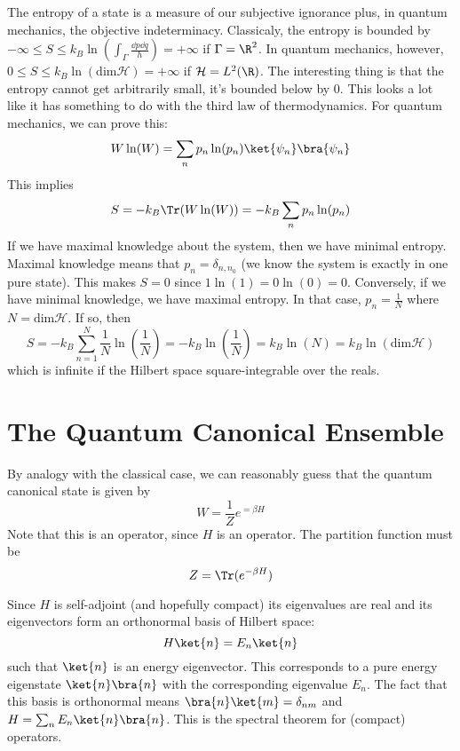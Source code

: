 \documentclass[a4paper,twoside,master.tex]{subfiles}
\begin{document}
The entropy of a state is a measure of our subjective ignorance plus, in quantum mechanics, the objective indeterminacy. Classicaly, the entropy is bounded by $ - \infty \leq S \leq k_B \ln(\int_{\Gamma} \frac{\dd{p} \dd{q}}{h}) = + \infty $ if $ \Gamma = \R^2 $. In quantum mechanics, however, $ 0 \leq S \leq k_B \ln(\text{dim} \mathcal{H}) = + \infty $ if $ \mathcal{H} = L^2(\R) $. The interesting thing is that the entropy cannot get arbitrarily small, it's bounded below by $ 0 $. This looks a lot like it has something to do with the third law of thermodynamics. For quantum mechanics, we can prove this:
\begin{equation}
    W \ln(W) = \sum_n p_n \ln(p_n)\ket{\psi_n}\bra{\psi_n}
\end{equation}
This implies
\begin{equation}
    S = - k_B \Tr(W \ln(W)) = - k_B \sum_n p_n \ln(p_n)
\end{equation}
If we have maximal knowledge about the system, then we have minimal entropy. Maximal knowledge means that $ p_n = \delta_{n,n_0} $ (we know the system is exactly in one pure state). This makes $ S = 0 $ since $ 1 \ln(1) = 0 \ln(0) = 0 $. Conversely, if we have minimal knowledge, we have maximal entropy. In that case, $ p_n = \frac{1}{N} $ where $ N = \text{dim} \mathcal{H} $. If so, then
\begin{equation}
    S = - k_B \sum_{n=1}^{N} \frac{1}{N} \ln(\frac{1}{N}) = - k_B \ln(\frac{1}{N}) = k_B \ln(N) = k_B \ln(\text{dim} \mathcal{H})
\end{equation}
which is infinite if the Hilbert space square-integrable over the reals.


\section{The Quantum Canonical Ensemble}
\label{sec:the_quantum_canonical_ensemble}

By analogy with the classical case, we can reasonably guess that the quantum canonical state is given by
\begin{equation}
    W = \frac{1}{Z} e^{= \beta H}
\end{equation}
Note that this is an operator, since $ H $ is an operator. The partition function must be
\begin{equation}
    Z = \Tr(e^{- \beta H})
\end{equation}

Since $ H $ is self-adjoint (and hopefully compact) its eigenvalues are real and its eigenvectors form an orthonormal basis of Hilbert space:
\begin{equation}
    H\ket{n} = E_n\ket{n}
\end{equation}
such that $\ket{n} $ is an energy eigenvector. This corresponds to a pure energy eigenstate $\ket{n}\bra{n} $ with the corresponding eigenvalue $ E_n $. The fact that this basis is orthonormal means $\bra{n}\ket{m} = \delta_{nm} $ and $ H = \sum_n E_n\ket{n}\bra{n} $. This is the spectral theorem for (compact) operators.
\end{document}
